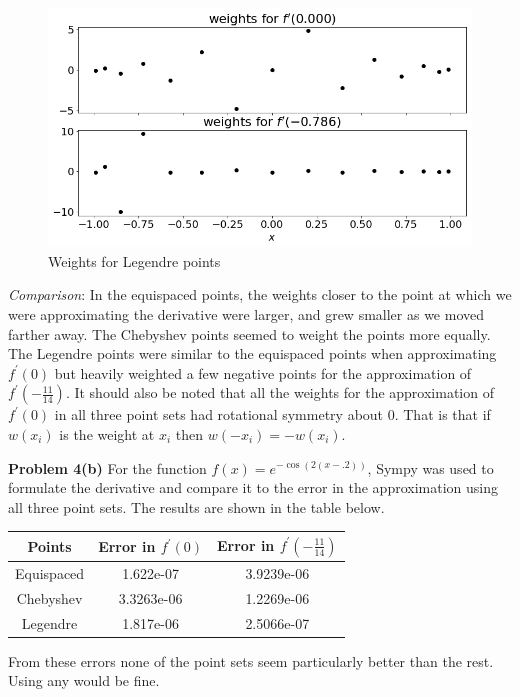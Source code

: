 \documentclass[12pt]{article}
\newcommand{\problem}[1]{\hspace{-4 ex} \large \textbf{Problem #1} }
\begin{document}
\begin{figure}[H]
	\caption{Weights for Legendre points}
	\label{lege_weights}
	\includegraphics[width=.9\textwidth]{hw1_p4b_lege_weights}
	\centering
\end{figure}
\bigbreak

\textit{Comparison}: In the equispaced points, the weights closer to the point at which we were approximating the derivative were larger, and grew smaller as we moved farther away. The Chebyshev points seemed to weight the points more equally. The Legendre points were similar to the equispaced points when approximating $f^\prime(0)$ but heavily weighted a few negative points for the approximation of $f^\prime(-\tfrac{11}{14})$. It should also be noted that all the weights for the approximation of $f^\prime(0)$ in all three point sets had rotational symmetry about $0$. That is that if $w(x_i)$ is the weight at $x_i$ then $w(-x_i) = -w(x_i)$.
\bigbreak


\problem{4(b)} For the function $f(x)=e^{-\cos(2(x-.2))}$, Sympy was used to formulate the derivative and compare it to the error in the approximation using all three point sets. The results are shown in the table below.

\begin{center}
	\begin{tabular}{|c|c|c|}
		\hline
		Points&Error in $f^\prime(0)$&Error in $f^\prime(-\tfrac{11}{14})$\\ \hline
		Equispaced&1.622e-07&3.9239e-06\\ \hline
		Chebyshev&3.3263e-06&1.2269e-06\\ \hline
		Legendre&1.817e-06&2.5066e-07\\ \hline
	\end{tabular}
\end{center}
From these errors none of the point sets seem particularly better than the rest. Using any would be fine.
\bigbreak
\end{document}
